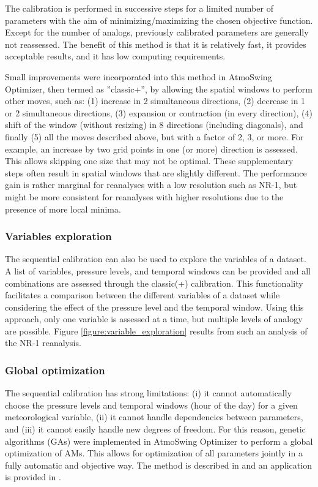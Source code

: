 \documentclass[review]{elsarticle}
\begin{document}
The calibration is performed in successive steps for a limited number of parameters with the aim of minimizing/maximizing the chosen objective function. Except for the number of analogs, previously calibrated parameters are generally not reassessed. The benefit of this method is that it is relatively fast, it provides acceptable results, and it has low computing requirements. 

Small improvements were incorporated into this method in AtmoSwing Optimizer, then termed as ''classic+'', by allowing the spatial windows to perform other moves, such as: (1) increase in 2 simultaneous directions, (2) decrease in 1 or 2 simultaneous directions, (3) expansion or contraction (in every direction), (4) shift of the window (without resizing) in 8 directions (including diagonals), and finally (5) all the moves described above, but with a factor of 2, 3, or more. For example, an increase by two grid points in one (or more) direction is assessed. This allows skipping one size that may not be optimal. These supplementary steps often result in spatial windows that are slightly different. The performance gain is rather marginal for reanalyses with a low resolution such as NR-1, but might be more consistent for reanalyses with higher resolutions due to the presence of more local minima.


\subsubsection{Variables exploration}
\label{sec:vars-explo}

The sequential calibration can also be used to explore the variables of a dataset. A list of variables, pressure levels, and temporal windows can be provided and all combinations are assessed through the classic(+) calibration. This functionality facilitates a comparison between the different variables of a dataset while considering the effect of the pressure level and the temporal window. Using this approach, only one variable is assessed at a time, but multiple levels of analogy are possible. Figure \ref{figure:variable_exploration} results from such an analysis of the NR-1 reanalysis. 


\subsubsection{Global optimization}
\label{sec:global-optimization}

The sequential calibration has strong limitations: (i) it cannot automatically choose the pressure levels and temporal windows (hour of the day) for a given meteorological variable, (ii) it cannot handle dependencies between parameters, and (iii) it cannot easily handle new degrees of freedom. For this reason, genetic algorithms (GAs) were implemented in AtmoSwing Optimizer to perform a global optimization of AMs. This allows for optimization of all parameters jointly in a fully automatic and objective way. The method is described in \citet{Horton2017a} and an application is provided in \citet{Horton2018a}.
\end{document}
